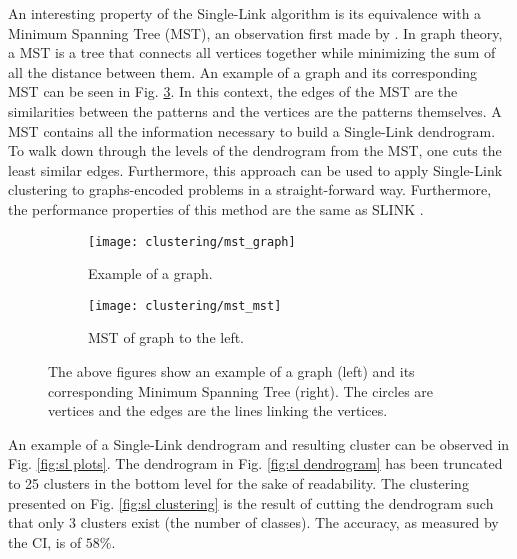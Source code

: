 An interesting property of the Single-Link algorithm is its equivalence with a Minimum Spanning Tree (MST), an observation first made by \cite{Gower1969}.
In graph theory, a MST is a tree that connects all vertices together while minimizing the sum of all the distance between them.
An example of a graph and its corresponding MST can be seen in Fig. \ref{fig:mst example}.
In this context, the edges of the MST are the similarities between the patterns and the vertices are the patterns themselves.
A MST contains all the information necessary to build a Single-Link dendrogram.
To walk down through the levels of the dendrogram from the MST, one cuts the least similar edges.
Furthermore, this approach can be used to apply Single-Link clustering to graphs-encoded problems in a straight-forward way.
Furthermore, the performance properties of this method are the same as SLINK 
\cite{Mullner2011}.

\begin{figure}[!ht]
    \centering
    \begin{subfigure}[b]{0.3\textwidth}
        \centering
        \texttt{[image: clustering/mst\_graph]}
        \caption{Example of a graph.}
        \label{fig:graph}
    \end{subfigure}
    \hspace{30pt}
    \begin{subfigure}[b]{0.3\textwidth}
        \centering
        \texttt{[image: clustering/mst\_mst]}
        \caption{MST of graph to the left.}
        \label{fig:graph mst}
    \end{subfigure}

    \caption{The above figures show an example of a graph (left) and its corresponding Minimum Spanning Tree (right). The circles are vertices and the edges are the lines linking the vertices.}
    \label{fig:mst example}
\end{figure}

An example of a Single-Link dendrogram and resulting cluster can be observed in Fig. \ref{fig:sl plots}.
The dendrogram in Fig. \ref{fig:sl dendrogram} has been truncated to 25 clusters in the bottom level for the sake of readability.
The clustering presented on Fig. \ref{fig:sl clustering} is the result of cutting the dendrogram such that only 3 clusters exist (the number of classes).
The accuracy, as measured by the CI, is of $58\%$.

